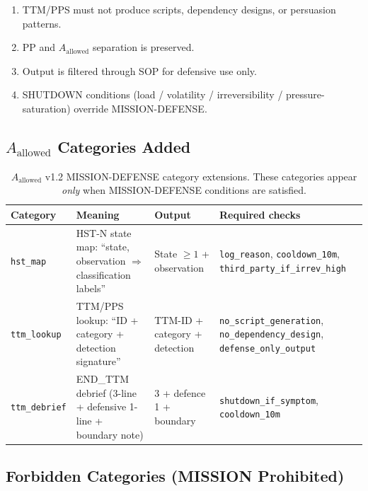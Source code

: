 \begin{enumerate}
\item TTM/PPS must not produce scripts, dependency designs, or
persuasion patterns.
\item PP and $A_{\mathrm{allowed}}$ separation is preserved.
\item Output is filtered through SOP for defensive use only.
\item SHUTDOWN conditions (load / volatility / irreversibility /
pressure-saturation) override MISSION-DEFENSE.
\end{enumerate}

\subsection{$A_{\mathrm{allowed}}$ Categories Added}
\label{sec:mission-defense-categories}

\begin{table}[ht]
\centering
\small
\begin{tabularx}{\linewidth}{lXXX}
\toprule
\textbf{Category} & \textbf{Meaning} & \textbf{Output} & \textbf{Required checks} \\
\midrule
\texttt{hst\_map}
& HST-N state map: ``state, observation $\Rightarrow$ classification
labels''
& State $\ge 1$ + observation
& \texttt{log\_reason}, \texttt{cooldown\_10m},
\texttt{third\_party\_if\_irrev\_high} \\

\texttt{ttm\_lookup}
& TTM/PPS lookup: ``ID + category + detection signature''
& TTM-ID + category + detection
& \texttt{no\_script\_generation},
\texttt{no\_dependency\_design},
\texttt{defense\_only\_output} \\

\texttt{ttm\_debrief}
& END\_TTM debrief (3-line + defensive 1-line + boundary note)
& 3 + defence 1 + boundary
& \texttt{shutdown\_if\_symptom},
\texttt{cooldown\_10m} \\
\bottomrule
\end{tabularx}
\caption[MISSION-DEFENSE category extensions]{$A_{\mathrm{allowed}}$
v1.2 MISSION-DEFENSE category extensions. These categories appear
\emph{only} when MISSION-DEFENSE conditions are satisfied.}
\label{tab:mission-defense-categories}
\end{table}

\subsection{Forbidden Categories (MISSION Prohibited)}
\label{sec:mission-defense-forbidden}

